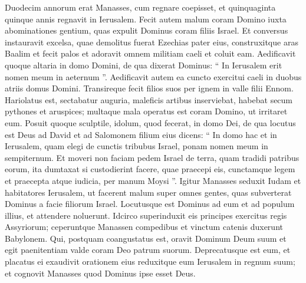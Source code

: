 \begin{biblechapter}
\begin{biblechapter}
\begin{biblechapter}
\begin{biblechapter}
\begin{biblechapter}
\begin{biblechapter}
\begin{biblechapter}
\begin{biblechapter}
\begin{biblechapter}
\begin{biblechapter}
\begin{biblechapter}
\begin{biblechapter}
\begin{biblechapter}
\begin{biblechapter}
\begin{biblechapter}
\begin{biblechapter}
\begin{biblechapter}
\begin{biblechapter}
\begin{biblechapter}
\begin{biblechapter}
\begin{biblechapter}
\begin{biblechapter}
\begin{biblechapter}
\begin{biblechapter}
\begin{biblechapter}
\begin{biblechapter}
\begin{biblechapter}
\begin{biblechapter}
\begin{biblechapter}
\begin{biblechapter}
\begin{biblechapter}
\begin{biblechapter}
\begin{biblechapter}
\verse Duodecim annorum erat Manasses, cum regnare coepisset, et quinquaginta quinque annis regnavit in Ierusalem.
 \verse Fecit autem malum coram Domino iuxta abominationes gentium, quas expulit Dominus coram filiis Israel. 
\verse Et conversus instauravit excelsa, quae demolitus fuerat Ezechias pater eius, construxitque aras Baalim et fecit palos et adoravit omnem militiam caeli et coluit eam. 
\verse Aedificavit quoque altaria in domo Domini, de qua dixerat Dominus: “ In Ierusalem erit nomen meum in aeternum ”. 
\verse Aedificavit autem ea cuncto exercitui caeli in duobus atriis domus Domini. 
\verse Transireque fecit filios suos per ignem in valle filii Ennom. Hariolatus est, sectabatur auguria, maleficis artibus inserviebat, habebat secum pythones et aruspices; multaque mala operatus est coram Domino, ut irritaret eum. 
\verse Posuit quoque sculptile, idolum, quod fecerat, in domo Dei, de qua locutus est Deus ad David et ad Salomonem filium eius dicens: “ In domo hac et in Ierusalem, quam elegi de cunctis tribubus Israel, ponam nomen meum in sempiternum. 
\verse Et moveri non faciam pedem Israel de terra, quam tradidi patribus eorum, ita dumtaxat si custodierint facere, quae praecepi eis, cunctamque legem et praecepta atque iudicia, per manum Moysi ”.
 \verse Igitur Manasses seduxit Iudam et habitatores Ierusalem, ut facerent malum super omnes gentes, quas subverterat Dominus a facie filiorum Israel.
 \verse Locutusque est Dominus ad eum et ad populum illius, et attendere noluerunt. 
\verse Idcirco superinduxit eis principes exercitus regis Assyriorum; ceperuntque Manassen compedibus et vinctum catenis duxerunt Babylonem. 
\verse Qui, postquam coangustatus est, oravit Dominum Deum suum et egit paenitentiam valde coram Deo patrum suorum. 
\verse Deprecatusque est eum, et placatus ei exaudivit orationem eius reduxitque eum Ierusalem in regnum suum; et cognovit Manasses quod Dominus ipse esset Deus.

\end{biblechapter}
\end{biblechapter}
\end{biblechapter}
\end{biblechapter}
\end{biblechapter}
\end{biblechapter}
\end{biblechapter}
\end{biblechapter}
\end{biblechapter}
\end{biblechapter}
\end{biblechapter}
\end{biblechapter}
\end{biblechapter}
\end{biblechapter}
\end{biblechapter}
\end{biblechapter}
\end{biblechapter}
\end{biblechapter}
\end{biblechapter}
\end{biblechapter}
\end{biblechapter}
\end{biblechapter}
\end{biblechapter}
\end{biblechapter}
\end{biblechapter}
\end{biblechapter}
\end{biblechapter}
\end{biblechapter}
\end{biblechapter}
\end{biblechapter}
\end{biblechapter}
\end{biblechapter}
\end{biblechapter}
